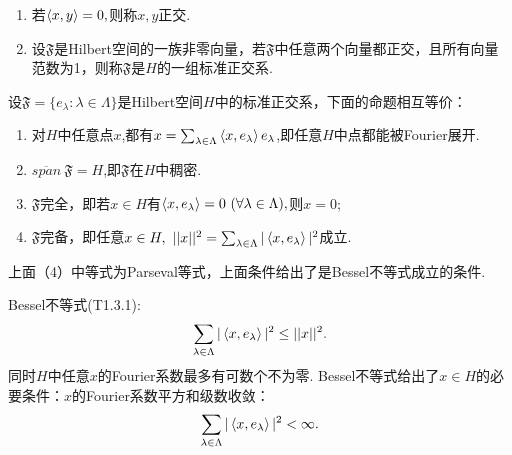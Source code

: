 \documentclass[lang=cn,10pt]{elegantbook}
\begin{document}
	\begin{definition}[正交和正交系]
		\begin{enumerate}
			\item 若\(\Braket{x,y}=0,\)则称\(x,y\)正交.
			\item 设\(\mathfrak{F}\)是Hilbert空间的一族非零向量，若\(\mathfrak{F}\)中任意两个向量都正交，且所有向量范数为1，则称\(\mathfrak{F}\)是\(H\)的一组标准正交系.
		\end{enumerate}
	\end{definition}
	\begin{theorem}[标准正交基的充要条件(T1.3.2)]
		设\(\mathfrak{F}=\{e_\lambda:\lambda \in \Lambda\}\)是Hilbert空间\(H\)中的标准正交系，下面的命题相互等价：
		\begin{enumerate}
			\item 对\(H\)中任意点\(x\),都有\(x=\sum_{\lambda \in \Lambda}\Braket{x,e_\lambda}e_\lambda\),即任意\(H\)中点都能被Fourier展开.
			\item \(\overline{span}\ \mathfrak{F}=H\),即\(\mathfrak{F}\)在\(H\)中稠密.
			\item \(\mathfrak{F}\)完全，即若\(x\in H\)有\(\Braket{x,e_\lambda}=0\ (\forall\lambda \in \Lambda),\)则\(x=0;\)
			\item \(\mathfrak{F}\)完备，即任意\(x\in H,\ ||x||^2=\sum_{\lambda \in \Lambda}|\Braket{x,e_\lambda}|^2\)成立.
		\end{enumerate}
	\end{theorem}
	\begin{note}
		上面（4）中等式为Parseval等式，上面条件给出了是Bessel不等式成立的条件.
		
		Bessel不等式(T1.3.1):
		\[\sum_{\lambda \in \Lambda}|\Braket{x,e_\lambda}|^2 \le ||x||^2.\]
		同时\(H\)中任意\(x\)的Fourier系数最多有可数个不为零.
		Bessel不等式给出了\(x\in H\)的必要条件：\(x\)的Fourier系数平方和级数收敛：
		\[\sum_{\lambda\in \Lambda}|\Braket{x,e_\lambda}|^2<\infty.\]
	\end{note}
\end{document}
